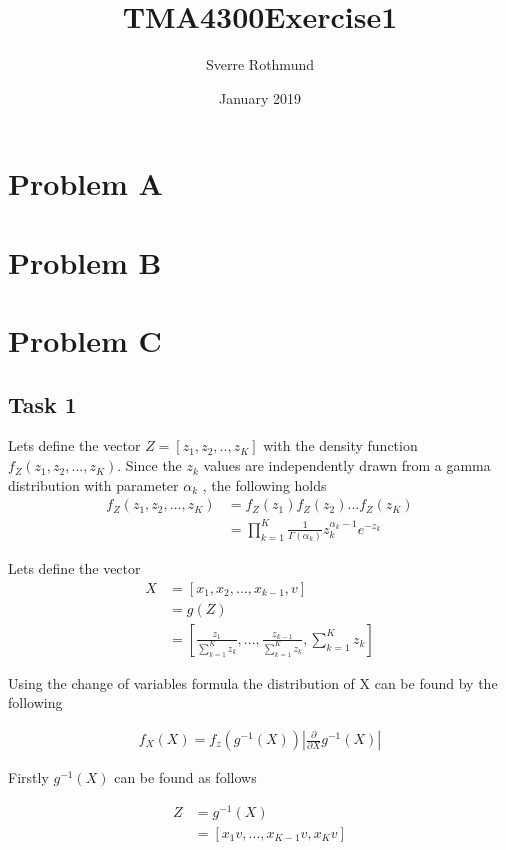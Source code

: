 \documentclass{article}
\title{TMA4300Exercise1}
\author{Sverre Rothmund}
\date{January 2019}
\begin{document}
\maketitle

\section{Problem A}

\section{Problem B}

\section{Problem C}
\subsection{Task 1}
Lets define the vector $Z = [z_1,z_2,..,z_K]$ with the density function $f_Z(z_1,z_2,...,z_K)$. Since the $z_k$ values are independently drawn from a gamma distribution with parameter $\alpha_k$ , the following holds
\begin{align}
    f_Z(z_1,z_2,...,z_K) &= f_Z(z_1) f_Z(z_2) ... f_Z(z_K) \\
    &= \prod_{k=1}^K \frac{1}{\Gamma(\alpha_k)} z_k^{\alpha_k -1} e^{-z_k}
\end{align}

Lets define the vector
\begin{align}
    X &= [x_1, x_2, ... , x_{k-1}, v]\\
    &= g(Z)\\
    &= \left[ \frac{z_1}{\sum_{k=1}^K z_k}, ... ,\frac{z_{k-1}}{\sum_{k=1}^K z_k},  \sum_{k=1}^K z_k\right]
\end{align}

Using the change of variables formula the distribution of X can be found by the following

\begin{align}
    f_X(X) = f_z(g^{-1}(X)) \left| \frac{\partial}{\partial X} g^{-1}(X) \right| \label{PC:change_of_variable}
\end{align}

Firstly $g^{-1}(X)$ can be found as follows

\begin{align}
    Z &= g^{-1}(X)\\
    &= \left[ x_1 v, ... , x_{K-1} v, x_{K} v \right] \label{PC:g_inv_pre}
\end{align}
\end{document}
